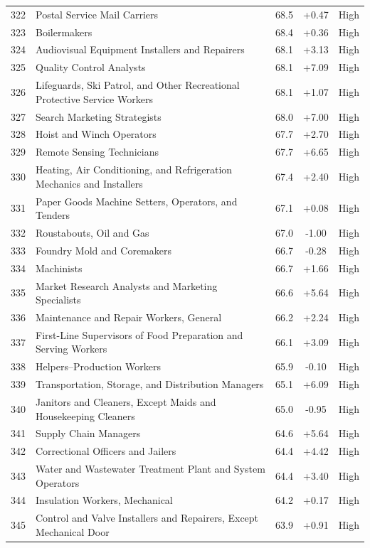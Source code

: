 {\begin{longtable}{rp{7cm}ccc}
322 & Postal Service Mail Carriers & 68.5 & +0.47 & High \\
323 & Boilermakers & 68.4 & +0.36 & High \\
324 & Audiovisual Equipment Installers and Repairers & 68.1 & +3.13 & High \\
325 & Quality Control Analysts & 68.1 & +7.09 & High \\
326 & Lifeguards, Ski Patrol, and Other Recreational Protective Service Workers & 68.1 & +1.07 & High \\
327 & Search Marketing Strategists & 68.0 & +7.00 & High \\
328 & Hoist and Winch Operators & 67.7 & +2.70 & High \\
329 & Remote Sensing Technicians & 67.7 & +6.65 & High \\
330 & Heating, Air Conditioning, and Refrigeration Mechanics and Installers & 67.4 & +2.40 & High \\
331 & Paper Goods Machine Setters, Operators, and Tenders & 67.1 & +0.08 & High \\
332 & Roustabouts, Oil and Gas & 67.0 & -1.00 & High \\
333 & Foundry Mold and Coremakers & 66.7 & -0.28 & High \\
334 & Machinists & 66.7 & +1.66 & High \\
335 & Market Research Analysts and Marketing Specialists & 66.6 & +5.64 & High \\
336 & Maintenance and Repair Workers, General & 66.2 & +2.24 & High \\
337 & First-Line Supervisors of Food Preparation and Serving Workers & 66.1 & +3.09 & High \\
338 & Helpers--Production Workers & 65.9 & -0.10 & High \\
339 & Transportation, Storage, and Distribution Managers & 65.1 & +6.09 & High \\
340 & Janitors and Cleaners, Except Maids and Housekeeping Cleaners & 65.0 & -0.95 & High \\
341 & Supply Chain Managers & 64.6 & +5.64 & High \\
342 & Correctional Officers and Jailers & 64.4 & +4.42 & High \\
343 & Water and Wastewater Treatment Plant and System Operators & 64.4 & +3.40 & High \\
344 & Insulation Workers, Mechanical & 64.2 & +0.17 & High \\
345 & Control and Valve Installers and Repairers, Except Mechanical Door & 63.9 & +0.91 & High \\

\end{longtable}}
